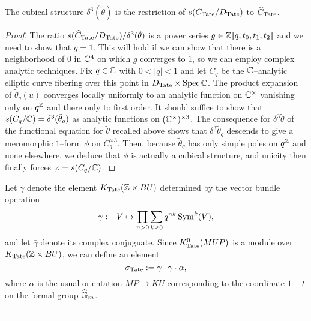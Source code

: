 \begin{theorem}
The cubical structure $\delta^3(\tilde \theta)$ is the restriction of $s(C_{\mathrm{Tate}} / D_{\mathrm{Tate}})$ to $\widehat C_{\mathrm{Tate}}$.
\end{theorem}
\begin{proof}
The ratio $s(\widehat C_{\mathrm{Tate}} / D_{\mathrm{Tate}}) / \delta^3(\tilde\theta)$ is a power series $g \in \mathbb Z\llbracket q, t_0, t_1, t_2\rrbracket$ and we need to show that $g = 1$.  This will hold if we can show that there is a neighborhood of $0$ in $\mathbb{C}^4$ on which $g$ converges to $1$, so we can employ complex analytic techniques.  Fix $q \in \mathbb{C}$ with $0 < |q| < 1$ and let $C_q$ be the $\mathbb{C}$--analytic elliptic curve fibering over this point in $D_{\mathrm{Tate}} \times \operatorname{Spec} \mathbb{C}$.  The product expansion of $\tilde\theta_q(u)$ converges locally uniformly to an analytic function on $\mathbb{C}^\times$ vanishing only on $q^{\mathbb Z}$ and there only to first order.  It should suffice to show that $s(C_q/\mathbb{C}) = \delta^3(\tilde\theta_q)$ as analytic functions on $(\mathbb{C}^\times)^{\times 3}$.  The consequence for $\delta^3 \tilde\theta$ of the functional equation for $\tilde\theta$ recalled above shows that $\delta^3\tilde\theta_q$ descends to give a meromorphic $1$--form $\phi$ on $C_q^{\times 3}$.  Then, because $\tilde\theta_q$ has only simple poles on $q^{\mathbb Z}$ and none elsewhere, we deduce that $\phi$ is actually a cubical structure, and unicity then finally forces $\varphi = s(C_q / \mathbb{C})$.
\end{proof}


\begin{definition}
Let $\gamma$ denote the element $K_{\mathrm{Tate}}(\mathbb Z \times BU)$ determined by the vector bundle operation \[\gamma: -V \mapsto \prod_{n > 0} \sum_{k \ge 0} q^{nk} \operatorname{Sym}^k(V),\] and let $\bar\gamma$ denote its complex conjuguate.  Since $K_{\mathrm{Tate}}^0(MUP)$ is a module over $K_{\mathrm{Tate}}(\mathbb Z \times BU)$, we can define an element \[\sigma_{\mathrm{Tate}} := \gamma \cdot \bar\gamma \cdot \alpha,\] where $\alpha$ is the usual orientation $MP \to KU$ corresponding to the coordinate $1 - t$ on the formal group $\widehat{\mathbb G}_m$.
\end{definition}



------------

